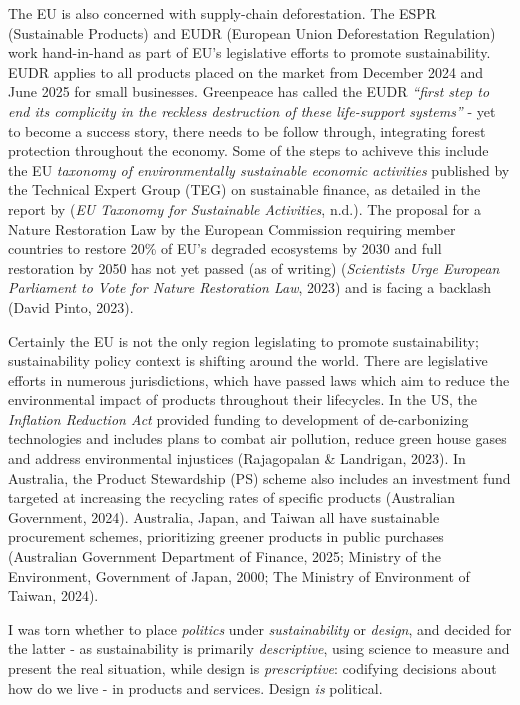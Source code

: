 \documentclass[
  12pt,
  letterpaper,
  DIV=11,
  numbers=noendperiod]{scrartcl}
\begin{document}
The EU is also concerned with supply-chain deforestation. The ESPR
(Sustainable Products) and EUDR (European Union Deforestation
Regulation) work hand-in-hand as part of EU's legislative efforts to
promote sustainability. EUDR applies to all products placed on the
market from December 2024 and June 2025 for small businesses. Greenpeace
has called the EUDR \emph{``first step to end its complicity in the
reckless destruction of these life-support systems''} - yet to become a
success story, there needs to be follow through, integrating forest
protection throughout the economy. Some of the steps to achiveve this
include the EU \emph{taxonomy of environmentally sustainable economic
activities} published by the Technical Expert Group (TEG) on sustainable
finance, as detailed in the report by (\emph{{EU} Taxonomy for
Sustainable Activities}, n.d.). The proposal for a Nature Restoration
Law by the European Commission requiring member countries to restore
20\% of EU's degraded ecosystems by 2030 and full restoration by 2050
has not yet passed (as of writing) (\emph{Scientists Urge {European
Parliament} to Vote for Nature Restoration Law}, 2023) and is facing a
backlash (David Pinto, 2023).

Certainly the EU is not the only region legislating to promote
sustainability; sustainability policy context is shifting around the
world. There are legislative efforts in numerous jurisdictions, which
have passed laws which aim to reduce the environmental impact of
products throughout their lifecycles. In the US, the \emph{Inflation
Reduction Act} provided funding to development of de-carbonizing
technologies and includes plans to combat air pollution, reduce green
house gases and address environmental injustices (Rajagopalan \&
Landrigan, 2023). In Australia, the Product Stewardship (PS) scheme also
includes an investment fund targeted at increasing the recycling rates
of specific products (Australian Government, 2024). Australia, Japan,
and Taiwan all have sustainable procurement schemes, prioritizing
greener products in public purchases (Australian Government Department
of Finance, 2025; Ministry of the Environment, Government of Japan,
2000; The Ministry of Environment of Taiwan, 2024).

I was torn whether to place \emph{politics} under \emph{sustainability}
or \emph{design}, and decided for the latter - as sustainability is
primarily \emph{descriptive}, using science to measure and present the
real situation, while design is \emph{prescriptive}: codifying decisions
about how do we live - in products and services. Design \emph{is}
political.
\end{document}

